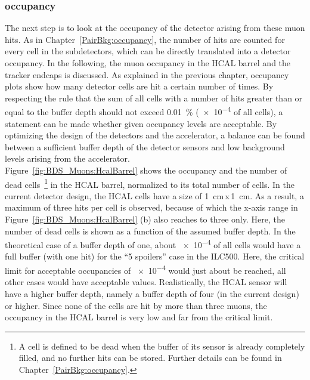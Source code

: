\subsubsection{\sid occupancy}
\label{BDS_Muons:sidocc}
The next step is to look at the occupancy of the detector arising from these muon hits.
As in Chapter~\ref{PairBkg:occupancy}, the number of hits are counted for every cell in the subdetectors, which can be directly translated into a detector occupancy.
In the following, the muon occupancy in the \sid HCAL barrel and the tracker endcaps is discussed.
As explained in the previous chapter, occupancy plots show how many detector cells are hit a certain number of times. 
By respecting the rule that the sum of all cells with a number of hits greater than or equal to the buffer depth should not exceed \SI{0.01}{\percent} (\num{e-4} of all cells), a statement can be made whether given occupancy levels are acceptable.
By optimizing the design of the detectors and the accelerator, a balance can be found between a sufficient buffer depth of the detector sensors and low background levels arising from the accelerator.
\\Figure~\ref{fig:BDS_Muons:HcalBarrel} shows the occupancy and the number of dead cells~\footnote{A cell is defined to be dead when the buffer of its sensor is already completely filled, and no further hits can be stored. Further details can be found in Chapter~\ref{PairBkg:occupancy}.} in the HCAL barrel, normalized to its total number of cells.
In the current detector design, the HCAL cells have a size of \SI{1}{\centi\meter}\,x\,\SI{1}{\centi\meter}.
As a result, a maximum of three hits per cell is observed, because of which the x-axis range in Figure~\ref{fig:BDS_Muons:HcalBarrel} (b) also reaches to three only.
Here, the number of dead cells is shown as a function of the assumed buffer depth.
In the theoretical case of a buffer depth of one, about \num{e-4} of all cells would have a full buffer (with one hit) for the ``5 spoilers'' case in the ILC500.
Here, the critical limit for acceptable occupancies of \num{e-4} would just about be reached, all other cases would have acceptable values.
Realistically, the HCAL sensor will have a higher buffer depth, namely a buffer depth of four (in the current design) or higher.
Since none of the cells are hit by more than three muons, the occupancy in the HCAL barrel is very low and far from the critical limit.
